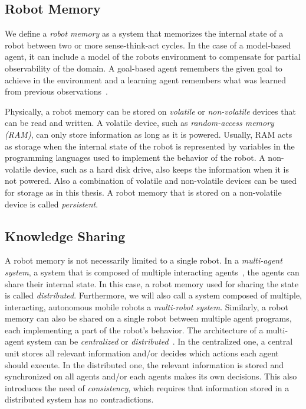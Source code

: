 \subsection{Robot Memory}
\label{sec:robot-memories}
We define a \emph{robot memory} as a system that memorizes the
internal state of a robot between two or more sense-think-act
cycles. In the case of a model-based agent, it can include a model of
the robots environment to compensate for partial observability of the
domain. A goal-based agent remembers the given goal to achieve in the
environment and a learning agent remembers what was learned from
previous observations~\cite{aimodern}.

Physically, a robot memory can be stored on \emph{volatile} or
\emph{non-volatile} devices that can be read and written. A volatile
device, such as \emph{random-access memory (RAM)}, can only store
information as long as it is powered. Usually, RAM acts as storage
when the internal state of the robot is represented by variables in
the programming languages used to implement the behavior of the
robot.  A non-volatile device, such as a hard disk drive, also keeps
the information when it is not powered. Also a combination of volatile
and non-volatile devices can be used for storage as in this thesis. A
robot memory that is stored on a non-volatile device is called
\emph{persistent}.

\subsection{Knowledge Sharing}
\label{sec:knowledge-sharing}
A robot memory is not necessarily limited to a single robot. In a
\emph{multi-agent system}, a system that is composed of multiple
interacting agents~\cite{multiagentsystems}, the agents can share
their internal state. In this case, a robot memory used for sharing
the state is called
\emph{distributed}. Furthermore, we will also call a system composed
of multiple, interacting, autonomous mobile robots a \emph{multi-robot
  system}. Similarly, a robot memory can also be shared on a single
robot between multiple agent programs, each implementing a part of
the robot's behavior. The architecture of a multi-agent system can be
\emph{centralized} or \emph{distributed}~\cite{RCLL-Planning}. In the centralized one,
a central unit stores all relevant information and/or decides which
actions each agent should execute. In the distributed one, the
relevant information is stored and synchronized on all agents and/or
each agents makes its own decisions. This also introduces the need of
\emph{consistency}, which requires that information stored in a
distributed system has no contradictions.

